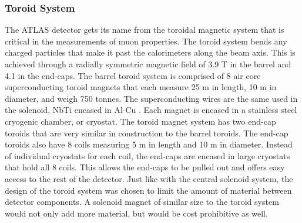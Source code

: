 	\subsubsection{Toroid System}\label{sssec:toroid}
		The \gls{ATLAS} detector gets its name from the toroidal magnetic system that is critical in the measurements of muon properties. The toroid system bends any charged particles that make it past the calorimeters along the beam axis. This is achieved through a radially symmetric magnetic field of 3.9 T in the barrel and 4.1 in the end-caps. The barrel toroid system is comprised of 8 air core superconducting toroid magnets that each measure 25 m in length, 10 m in diameter, and weigh 750 tonnes. The superconducting wires are the same used in the solenoid, NbTi encased in Al-Cu \cite{atlas-toroid}. Each magnet is encased in a stainless steel cryogenic chamber, or cryostat. The toroid magnet system has two end-cap toroids that are very similar in construction to the barrel toroids. The end-cap toroids also have 8 coils measuring 5 m in length and 10 m in diameter. Instead of individual cryostats for each coil, the end-caps are encased in large cryostats that hold all 8 coils. This allows the end-caps to be pulled out and offers easy access to the rest of the detector. Just like with the central solenoid system, the design of the toroid system was chosen to limit the amount of material between detector components. A solenoid magnet of similar size to the toroid system would not only add more material, but would be cost prohibitive as well.



